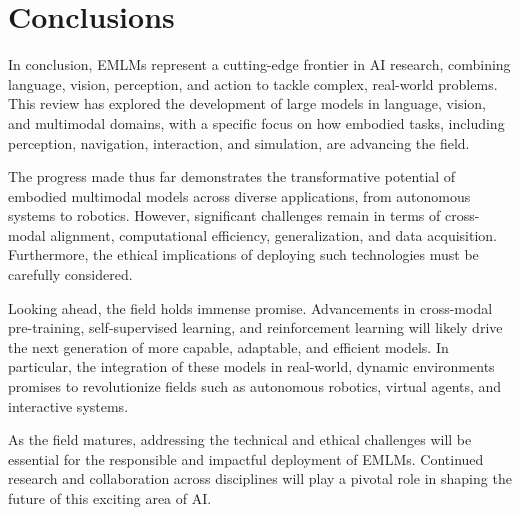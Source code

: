\section{Conclusions}
\label{sec:CON}
In conclusion, EMLMs represent a cutting-edge frontier in AI research, combining language, vision, perception, and action to tackle complex, real-world problems. This review has explored the development of large models in language, vision, and multimodal domains, with a specific focus on how embodied tasks, including perception, navigation, interaction, and simulation, are advancing the field.

The progress made thus far demonstrates the transformative potential of embodied multimodal models across diverse applications, from autonomous systems to robotics. However, significant challenges remain in terms of cross-modal alignment, computational efficiency, generalization, and data acquisition. Furthermore, the ethical implications of deploying such technologies must be carefully considered.

Looking ahead, the field holds immense promise. Advancements in cross-modal pre-training, self-supervised learning, and reinforcement learning will likely drive the next generation of more capable, adaptable, and efficient models. In particular, the integration of these models in real-world, dynamic environments promises to revolutionize fields such as autonomous robotics, virtual agents, and interactive systems.

As the field matures, addressing the technical and ethical challenges will be essential for the responsible and impactful deployment of EMLMs. Continued research and collaboration across disciplines will play a pivotal role in shaping the future of this exciting area of AI.
